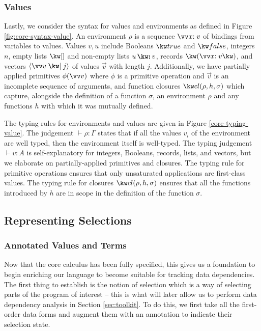 \subsubsection{Values}
Lastly, we consider the syntax for values and environments as defined in Figure \ref{fig:core-syntax-value}. 
An environment $\rho$ is a sequence $\vec{\bind{x}{v}}$ of bindings from variables to values. Values $v, u$ include Booleans $\exTrue$ and $\exFalse$, integers $n$, empty lists $\exNil$ and non-empty lists $\exCons{u}{v}$, records $\exRec{\vec{\bind{x}{v}}}$, and vectors $\exVecVal{\vec{v}}{j}$ of values $\vec{v}$ with length $j$. Additionally, we have partially applied primitives $\exPrimOp{\phi}{\vec{v}}$ where $\phi$ is a primitive operation and $\vec{v}$ is an incomplete sequence of arguments, and function closures $\exClosure{\rho}{h}{\sigma}$ which capture, alongside the definition of a function $\sigma$, an environment $\rho$ and any functions $h$ with which it was mutually defined.


\noindent
The typing rules for environments and values are given in Figure \ref{core-typing-value}. The judgement $\vdash \rho: \Gamma$ states that if all the values $v_i$ of the environment are well typed, then the environment itself is well-typed. The typing judgement $\vdash v: A$ is self-explanatory for integers, Booleans, records, lists, and vectors, but we elaborate on partially-applied primitives and closures. The typing rule for primitive operations ensures that only unsaturated applications are first-class values. The typing rule for closures $\exClosure{\rho}{h}{\sigma}$ ensures that all the functions introduced by $h$ are in scope in the definition of the function $\sigma$.



\subsection{Representing Selections}
\label{sec:core-language:selections}
\subsubsection{Annotated Values and Terms}


Now that the core calculus has been fully specified, this gives us a foundation to begin enriching our language to become suitable for tracking data dependencies. The first thing to establish is the notion of selection which is a way of selecting parts of the program of interest -- this is what will later allow us to perform data dependency analysis in Section \ref{sec:toolkit}. To do this, we first take all the first-order data forms and augment them with an annotation to indicate their selection state.

